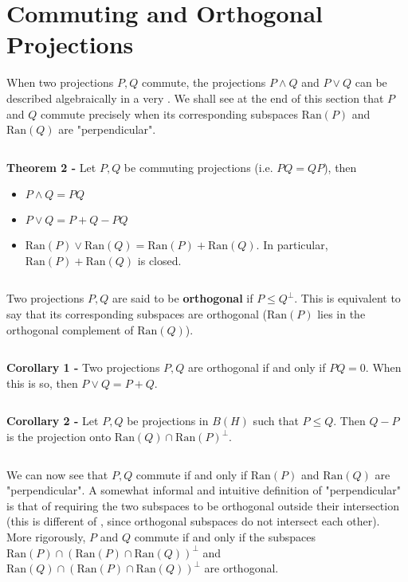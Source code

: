 \documentclass[12pt]{article}
\begin{document}
\section{Commuting and Orthogonal Projections}

When two projections $P, Q$ commute, the projections $P \land Q$ and $P \lor Q$ can be described algebraically in a very . We shall see at the end of this section that $P$ and $Q$ commute precisely when its corresponding subspaces $\mathrm{Ran}(P)$ and $\mathrm{Ran}(Q)$ are "perpendicular".

$\;$

{\bf Theorem 2 -} Let $P, Q$ be commuting projections (i.e. $PQ = QP$), then
\begin{itemize}
\item $P \land Q = PQ$
\item $P \lor Q = P + Q - PQ$
\item $\mathrm{Ran}(P) \lor \mathrm{Ran}(Q) = \mathrm{Ran}(P) + \mathrm{Ran}(Q)$. In particular, $\mathrm{Ran}(P) + \mathrm{Ran}(Q)$ is closed.
\end{itemize}

$\,$

Two projections $P, Q$ are said to be {\bf orthogonal} if $P \leq Q^{\perp}$. This is equivalent to say that its corresponding subspaces are orthogonal ($\mathrm{Ran}(P)$ lies in the orthogonal complement of $\mathrm{Ran}(Q)$).

$\,$

{\bf Corollary 1 -} Two projections $P, Q$ are orthogonal if and only if $PQ= 0$. When this is so, then $P \lor Q = P + Q$.

$\,$

{\bf Corollary 2 -} Let $P, Q$ be projections in $B(H)$ such that $P \leq Q$. Then $Q-P$ is the projection onto $\mathrm{Ran}(Q) \cap \mathrm{Ran}(P)^{\perp}$.

$\,$

We can now see that $P, Q$ commute if and only if $\mathrm{Ran}(P)$ and $\mathrm{Ran}(Q)$ are "perpendicular". A somewhat informal and intuitive definition of "perpendicular" is that of requiring the two subspaces to be orthogonal outside their intersection (this is different of , since orthogonal subspaces do not  intersect each other). More rigorously, $P$ and $Q$ commute if and only if the subspaces $\mathrm{Ran}(P) \cap (\mathrm{Ran}(P) \cap \mathrm{Ran}(Q))^{\perp}$ and $\mathrm{Ran}(Q) \cap (\mathrm{Ran}(P) \cap \mathrm{Ran}(Q))^{\perp}$ are orthogonal. 
\end{document}
